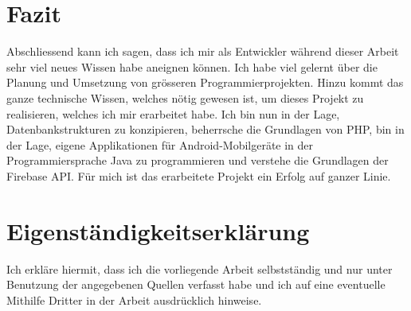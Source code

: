 \documentclass[../main.tex]{subfiles}
\begin{document}
	\section{Fazit}
	Abschliessend kann ich sagen, dass ich mir als Entwickler während dieser Arbeit sehr viel neues Wissen habe aneignen können. Ich habe viel gelernt über die Planung und Umsetzung von grösseren Programmierprojekten. Hinzu kommt das ganze technische  Wissen, welches nötig gewesen ist, um dieses Projekt zu realisieren, welches ich mir erarbeitet habe. Ich bin nun in der Lage, Datenbankstrukturen zu konzipieren, beherrsche die Grundlagen von PHP, bin in der Lage, eigene Applikationen für Android-Mobilgeräte in der Programmiersprache Java zu programmieren und verstehe die Grundlagen der Firebase API. Für mich ist das erarbeitete Projekt ein Erfolg auf ganzer Linie.
	
	\newpage
	\section*{Eigenständigkeitserklärung}
	Ich erkläre hiermit, dass ich die vorliegende Arbeit selbstständig und nur unter Benutzung der angegebenen Quellen verfasst habe und ich auf eine eventuelle Mithilfe Dritter in der Arbeit ausdrücklich hinweise.
	
\end{document}

